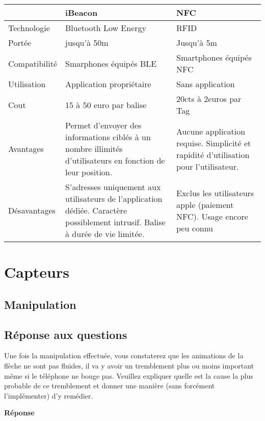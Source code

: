\documentclass[francais,12pt]{article}
\begin{document}
	
		\begin{tabular}{|l|p{6cm}|p{6cm}|}
		\hline 
		\rowcolor{lightgray}& iBeacon & NFC \\ 
		\hline 
		Technologie & Bluetooth Low Energy  & RFID  \\ 
		\hline 
		Portée & jusqu'à 50m  & Jusqu'à 5m \\ 
		\hline 
		Compatibilité & Smarphones équipés BLE  & Smartphones équipés NFC  \\ 
		\hline 
		Utilisation & Application propriétaire & Sans application \\ 
		\hline 
		Cout &  15 à 50 euro par balise & 20cts à 2euros par Tag \\ 
		\hline 
		Avantages & Permet d'envoyer des informations ciblés à un nombre illimités d'utilisateurs en fonction de leur position.  & Aucune application requise. Simplicité et rapidité d'utilisation pour l'utilisateur. \\ 
		\hline 
		Désavantages & S'adresses uniquement aux utilisateurs de l'application dédiée. Caractère possiblement intrusif. Balise à durée de vie limitée. & Exclus les utilisateurs apple (paiement NFC). Usage encore peu connu \\ 
		\hline 
	\end{tabular} 
	
	\section*{Capteurs}
	\subsection*{Manipulation}
	\subsection*{Réponse aux questions}
	Une fois la manipulation effectuée, vous constaterez que les animations de la flèche ne sont pas fluides, il va y avoir un tremblement plus ou moins important même si le téléphone ne bouge pas. Veuillez expliquer quelle est la cause la plus probable de ce tremblement et donner une manière (sans forcément l’implémenter) d’y remédier. 
	
	{\color[rgb]{0,0.5,0.23}\textbf{Réponse}}
	
	
	
\end{document}
